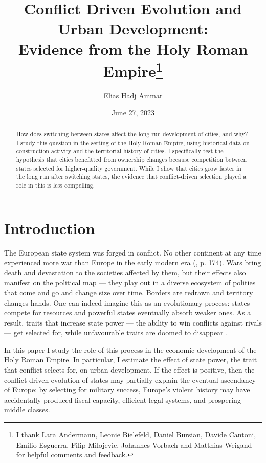 \documentclass[11pt, a4paper]{article}
\title{Conflict Driven Evolution and Urban Development: \\ Evidence from the Holy Roman Empire\footnote{
I thank Lara Andermann, Leonie Bielefeld, Daniel Bursian, Davide Cantoni, Emilio Esguerra, Filip Milojevic, Johannes Vorbach and Matthias Weigand for helpful comments and feedback.
}
}
\author{Elias Hadj Ammar}
\date{June 27, 2023}
\begin{document}
\onehalfspacing
\maketitle
\thispagestyle{empty}

\begin{abstract}
How does switching between states affect the long-run development of cities, and why? I study this question in the setting of the Holy Roman Empire, using historical data on construction activity and the territorial history of cities. I specifically test the hypothesis that cities benefitted from ownership changes because competition between states selected for higher-quality government. While I show that cities grow faster in the long run after switching states, the evidence that conflict-driven selection played a role in this is less compelling.
\end{abstract}

\newpage

\setcounter{page}{1}
\doublespacing



\section{Introduction}



The European state system was forged in conflict. No other continent at any time experienced more war than Europe in the early modern era (\citealp{voigtlnder2013}, p. 174). Wars bring death and devastation to the societies affected by them, but their effects also manifest on the political map --- they play out in a diverse ecosystem of polities that come and go and change size over time. Borders are redrawn and territory changes hands. One can indeed imagine this as an evolutionary process: states compete for resources and powerful states eventually absorb weaker ones. As a result, traits that increase state power --- the ability to win conflicts against rivals --- get selected for, while unfavourable traits are doomed to disappear \citep{levine2021}.

In this paper I study the role of this process in the economic development of the Holy Roman Empire. In particular, I estimate the effect of state power, the trait that conflict selects for, on urban development. If the effect is positive, then the conflict driven evolution of states may partially explain the eventual ascendancy of Europe: by selecting for military success, Europe's violent history may have accidentally produced fiscal capacity, efficient legal systems, and prospering middle classes.
\end{document}
